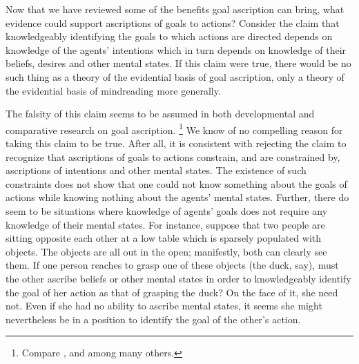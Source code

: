 \documentclass[14pt,a4paper]{extarticle}
\begin{document}
Now that we have reviewed some of the benefits goal ascription can bring,
what evidence could support ascriptions of goals to actions?
Consider the claim that 
knowledgeably identifying the goals to which actions are directed
depends on 
knowledge of the agents' intentions
which in turn depends 
on knowledge of their beliefs, desires and other mental states.
If this claim were true,
there would be no such thing as a theory of the evidential basis of goal ascription,
 only a theory of the evidential basis of mindreading more generally.

The falsity of this claim seems to be assumed in both developmental and comparative research on goal ascription.%
\footnote{ 
Compare \citet{Gergely:1995sq},
	\citet{Woodward:1998dm} and
	\citet{Penn:2007ey}
among many others.
}
We know of no compelling reason for taking this claim to be true.
After all,
it is consistent with rejecting the claim to recognize that
 ascriptions of goals to actions
 constrain, and are constrained by,
 ascriptions of intentions and other mental states.
The existence of such constraints does not show that one could 
not know something about the goals of actions 
while  knowing nothing about the agents' mental states.
Further,
there do seem to be situations where knowledge of agents' goals does not require any knowledge of their mental states.
For instance,
suppose that two people are sitting opposite each other at a low table
 which is 
sparsely populated with objects.
The objects are all out in the open; manifestly, both can clearly see them.
If one person reaches to grasp one of these objects (the duck, say), 
must the other ascribe beliefs or other mental states in order to knowledgeably identify the goal of her action as that of grasping the duck?
On the face of it, she need not.  
Even if she had no ability to ascribe mental states, it seems she might nevertheless be in a position to identify the goal of the other's action.
\end{document}
